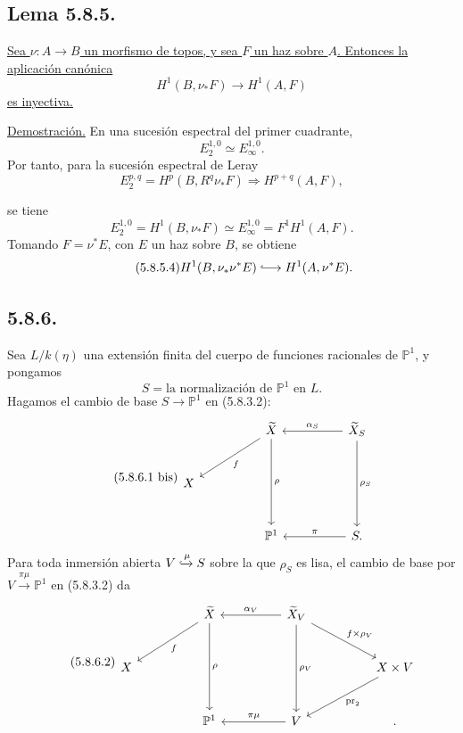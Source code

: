 \subsection*{Lema 5.8.5.}
\underline{Sea $\nu:A\to B$ un morfismo de topos, y sea $F$ un haz
sobre $A$. Entonces la aplicación canónica}
\begin{equation}\tag{5.8.5.1}
H^1(B,\nu_*F)\longrightarrow H^1(A,F)
\end{equation}
\underline{es inyectiva.}

\noindent\underline{Demostración.}
En una sucesión espectral del primer cuadrante,
\begin{equation}\tag{5.8.5.2}
E_2^{1,0}\simeq E_\infty^{1,0}.
\end{equation}
Por tanto, para la sucesión espectral de Leray
\[
E_2^{p,q}=H^p(B,R^q\nu_*F)
\Longrightarrow H^{p+q}(A,F),
\]

\pageoriginale

se tiene
\begin{equation}\tag{5.8.5.3}
E_2^{1,0}=H^1(B,\nu_*F)
\simeq E_\infty^{1,0}
=F^1H^1(A,F).
\end{equation}
Tomando $F=\nu^*E$, con $E$ un haz sobre $B$, se obtiene
\begin{equation}\tag{5.8.5.4}
H^1(B,\nu_*\nu^*E)
\lhook\joinrel\longrightarrow
H^1(A,\nu^*E).
\end{equation}

\subsection*{5.8.6.}
Sea $L/k(\eta)$ una extensión finita del cuerpo de funciones racionales
de $\mathbb P^1$, y pongamos
\begin{equation}\tag{5.8.6.1}
S=\text{la normalización de $\mathbb P^1$ en $L$}.
\end{equation}
Hagamos el cambio de base $S\to\mathbb P^1$ en (5.8.3.2):
\begin{equation}\tag{5.8.6.1 bis}
\begin{tikzcd}[column sep=huge,row sep=large]
{} & \widetilde X \arrow[dl,"f"] \arrow[dd,"\rho"]
& \widetilde X_S \arrow[l,"\alpha_S"'] \arrow[dd,"\rho_S"] \\
X&{}&{} \\
{} & \mathbb P^1 & S\arrow[l,"\pi"'] .
\end{tikzcd}
\end{equation}
Para toda inmersión abierta $V\xhookrightarrow{\mu}S$ sobre la que
$\rho_S$ es lisa, el cambio de base por
$V\xrightarrow{\pi\mu}\mathbb P^1$ en (5.8.3.2) da
\begin{equation}\tag{5.8.6.2}
\begin{tikzcd}[column sep=huge,row sep=large]
{} & \widetilde X \arrow[dl,"f"] \arrow[dd,"\rho"]
& \widetilde X_V \arrow[l,"\alpha_V"'] \arrow[dd,"\rho_V"]
  \arrow[dr,"f\times\rho_V"] &{} \\
X&{}&{}&X\times V\arrow[dl,"\operatorname{pr}_2"] \\
{} & \mathbb P^1 & V\arrow[l,"\pi\mu"'] &{} .
\end{tikzcd}
\end{equation}

